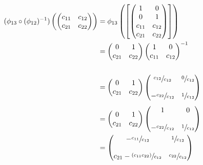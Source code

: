 \begin{align}
	\begin{split}
		(\phi_{13} \circ (\phi_{12})^{-1}) \left( \begin{pmatrix} c_{11} & c_{12} \\ c_{21} & c_{22} \end{pmatrix} \right) &= \phi_{13} \left( \left[ \begin{pmatrix} 1 & 0 \\ 0 & 1 \\ c_{11} & c_{12} \\ c_{21} & c_{22} \end{pmatrix} \right] \right)\\
		&= \begin{pmatrix} 0 & 1 \\ c_{21} & c_{22} \end{pmatrix} \begin{pmatrix} 1 & 0 \\ c_{11} & c_{12} \end{pmatrix}^{-1}\\\\
		&= \begin{pmatrix} 0 & 1 \\ c_{21} & c_{22} \end{pmatrix} \begin{pmatrix} \sfrac{c_{12}}{c_{12}} & \sfrac{0}{c_{12}} \\\\ - \sfrac{c_{22}}{c_{12}} & \sfrac{1}{c_{12}} \end{pmatrix}\\\\
		&= \begin{pmatrix} 0 & 1 \\ c_{21} & c_{22} \end{pmatrix} \begin{pmatrix} 1 & 0 \\\\ - \sfrac{c_{22}}{c_{12}} & \sfrac{1}{c_{12}} \end{pmatrix}\\
		&= \begin{pmatrix} - \sfrac{c_{11}}{c_{12}} & \sfrac{1}{c_{12}} \\\\ c_{21} - \sfrac{(c_{11} c_{22})}{c_{12}} & \sfrac{c_{22}}{c_{12}} \end{pmatrix}
	\end{split}
\end{align}

